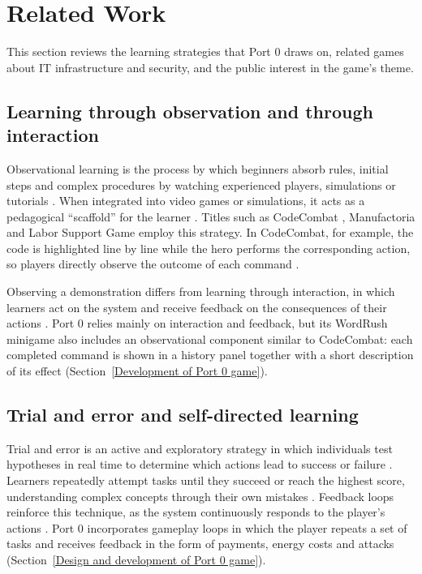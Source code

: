 \documentclass[runningheads]{llncs}
\begin{document}
\section{Related Work}

This section reviews the learning strategies that Port 0 draws on, related games about IT infrastructure and security, and the public interest in the game's theme.

\subsection{Learning through observation and through interaction}

Observational learning is the process by which beginners absorb rules, initial steps and complex procedures by watching experienced players, simulations or tutorials \cite{Martens2008}. When integrated into video games or simulations, it acts as a pedagogical ``scaffold'' for the learner \cite{Martens2008}. Titles such as CodeCombat \cite{codecombat}, Manufactoria \cite{manufactoria} and Labor Support Game \cite{labor_support_game} employ this strategy. In CodeCombat, for example, the code is highlighted line by line while the hero performs the corresponding action, so players directly observe the outcome of each command \cite{villareale2020}.

Observing a demonstration differs from learning through interaction, in which learners act on the system and receive feedback on the consequences of their actions \cite{villareale2020,Ibrahim2010}. Port 0 relies mainly on interaction and feedback, but its WordRush minigame also includes an observational component similar to CodeCombat: each completed command is shown in a history panel together with a short description of its effect (Section~\ref{Development of Port 0 game}).

\subsection{Trial and error and self-directed learning}

Trial and error is an active and exploratory strategy in which individuals test hypotheses in real time to determine which actions lead to success or failure \cite{villareale2020}. Learners repeatedly attempt tasks until they succeed or reach the highest score, understanding complex concepts through their own mistakes \cite{Marques2021,Sari2025}. Feedback loops reinforce this technique, as the system continuously responds to the player's actions \cite{Ibrahim2010}. Port 0 incorporates gameplay loops in which the player repeats a set of tasks and receives feedback in the form of payments, energy costs and attacks (Section~\ref{Design and development of Port 0 game}).
\end{document}
